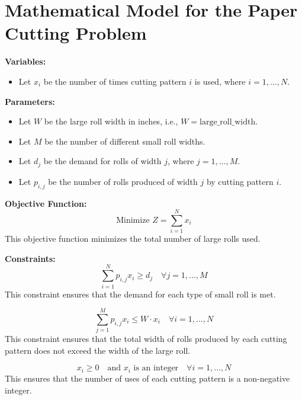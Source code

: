 \documentclass{article}
\begin{document}
\section*{Mathematical Model for the Paper Cutting Problem}

\textbf{Variables:}
\begin{itemize}
    \item Let \( x_i \) be the number of times cutting pattern \( i \) is used, where \( i = 1, \ldots, N \).
\end{itemize}

\textbf{Parameters:}
\begin{itemize}
    \item Let \( W \) be the large roll width in inches, i.e., \( W = \text{large\_roll\_width} \).
    \item Let \( M \) be the number of different small roll widths.
    \item Let \( d_j \) be the demand for rolls of width \( j \), where \( j = 1, \ldots, M \).
    \item Let \( p_{i,j} \) be the number of rolls produced of width \( j \) by cutting pattern \( i \).
\end{itemize}

\textbf{Objective Function:}
\[
\text{Minimize } Z = \sum_{i=1}^{N} x_i
\]
This objective function minimizes the total number of large rolls used.

\textbf{Constraints:}
\[
\sum_{i=1}^{N} p_{i,j} x_i \geq d_j \quad \forall j = 1, \ldots, M
\]
This constraint ensures that the demand for each type of small roll is met.

\[
\sum_{j=1}^{M} p_{i,j} x_i \leq W \cdot x_i \quad \forall i = 1, \ldots, N
\]
This constraint ensures that the total width of rolls produced by each cutting pattern does not exceed the width of the large roll.

\[
x_i \geq 0 \quad \text{and } x_i \text{ is an integer} \quad \forall i = 1, \ldots, N
\]
This ensures that the number of uses of each cutting pattern is a non-negative integer.
\end{document}
